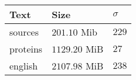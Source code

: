 \documentclass{article}
\begin{document}
\vspace{1cm}
\begin{tabular}{|lll|}
  \hline
  Text & Size & $\sigma$ \\
  \hline
  sources & $201.10$ Mib & $229$ \\
  proteins & $1129.20$ MiB & $27$ \\
  english & $2107.98$ MiB & $238$ \\
  \hline
\end{tabular}


\end{document}
